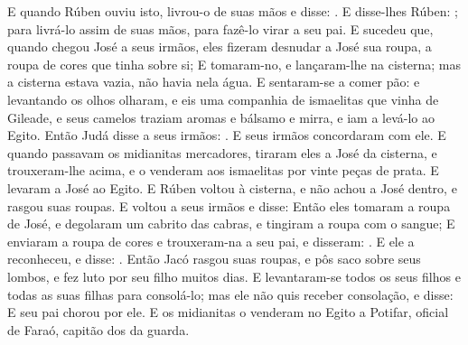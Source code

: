 {{  E quando Rúben ouviu isto, livrou-o de suas mãos e disse: .
  E disse-lhes Rúben: ; para livrá-lo assim de suas mãos, para fazê-lo virar a seu pai.
  E sucedeu que, quando chegou José a seus irmãos, eles fizeram desnudar a José sua roupa, a roupa de cores que tinha sobre si;
  E tomaram-no, e lançaram-lhe na cisterna; mas a cisterna estava vazia, não havia nela água.
  E sentaram-se a comer pão: e levantando os olhos olharam, e eis uma companhia de ismaelitas que vinha de Gileade, e seus camelos traziam aromas e bálsamo e mirra, e iam a levá-lo ao Egito.
  Então Judá disse a seus irmãos: . E seus irmãos concordaram com ele.
  E quando passavam os midianitas mercadores, tiraram eles a José da cisterna, e trouxeram-lhe acima, e o venderam aos ismaelitas por vinte peças de prata. E levaram a José ao Egito.
  E Rúben voltou à cisterna, e não achou a José dentro, e rasgou suas roupas.
  E voltou a seus irmãos e disse: 
  Então eles tomaram a roupa de José, e degolaram um cabrito das cabras, e tingiram a roupa com o sangue;
  E enviaram a roupa de cores e trouxeram-na a seu pai, e disseram: .
  E ele a reconheceu, e disse: .
  Então Jacó rasgou suas roupas, e pôs saco sobre seus lombos, e fez luto por seu filho muitos dias.
  E levantaram-se todos os seus filhos e todas as suas filhas para consolá-lo; mas ele não quis receber consolação, e disse:  E seu pai chorou por ele.
  E os midianitas o venderam no Egito a Potifar, oficial de Faraó, capitão dos da guarda.
\par }

}
